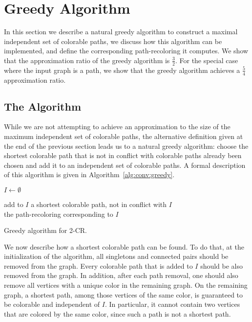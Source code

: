 \section{Greedy Algorithm}
\label{sec:greedy}

In this section we describe a natural greedy algorithm to construct a maximal
independent set of colorable paths, we discuss how this algorithm can be implemented,
and define the corresponding path-recoloring it computes.
%
We show that the approximation ratio of the greedy algorithm is $\frac{3}{2}$.
%
For the special case where the input graph is a path, 
we show that the greedy algorithm achieves a $\frac{5}{4}$ approximation ratio.


\subsection{The Algorithm}

While we are not attempting to achieve an approximation to the size
of the maximum independent set of colorable paths,
the alternative definition given at the end of the previous section
leads us to a natural greedy algorithm: 
choose the shortest colorable path that 
is not in conflict with colorable paths already been chosen and add it
to an independent set of colorable paths.
%
A formal description of this algorithm is given in
Algorithm~\ref{alg:conv:greedy}.

\begin{algorithm}
\begin{algorithmic}

\State $I \gets \emptyset$

\State add to $I$ a shortest colorable path, not in conflict with $I$ 
\EndWhile
\\
\Return the path-recoloring corresponding to $I$


\end{algorithmic}
\caption{Greedy algorithm for 2-CR.}
\label{alg:conv:greedy}
\end{algorithm}

We now describe how a shortest colorable path can be found.
%
To do that, 
at the initialization of the algorithm, 
all singletons and connected pairs should be removed from the graph.  
%
Every colorable path that is added to $I$ should be also removed from the graph.  
%
In addition, 
after each path removal, 
one should also remove all vertices with a unique color in the remaining graph.  
%
On the remaining graph, 
a shortest path, 
among those vertices of the same color, 
is guaranteed to be colorable and independent of $I$.
%
In particular,
it cannot contain two vertices that are colored by the same color, 
since such a path is not a shortest path.

